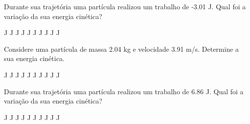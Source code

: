 \documentclass[addpoints]{exam}
\begin{document}
        \begin{questions}
\question[33] Durante sua trajetória uma partícula realizou um trabalho de   -3.01 J. Qual foi a variação da sua energia cinética?
\linebreak\linebreak

\begin{oneparchoices}
 J J J J J J J J J J\end{oneparchoices}
\question[23] Considere uma partícula de massa    2.04 kg e velocidade    3.91 m/s. Determine a sua energia cinética.
\linebreak\linebreak

\begin{oneparchoices}
 J J J J J J J J J J\end{oneparchoices}
\question[11] Durante sua trajetória uma partícula realizou um trabalho de    6.86 J. Qual foi a variação da sua energia cinética?
\linebreak\linebreak

\begin{oneparchoices}
 J J J J J J J J J J\end{oneparchoices}
\end{questions}
\newpage
\end{document}
